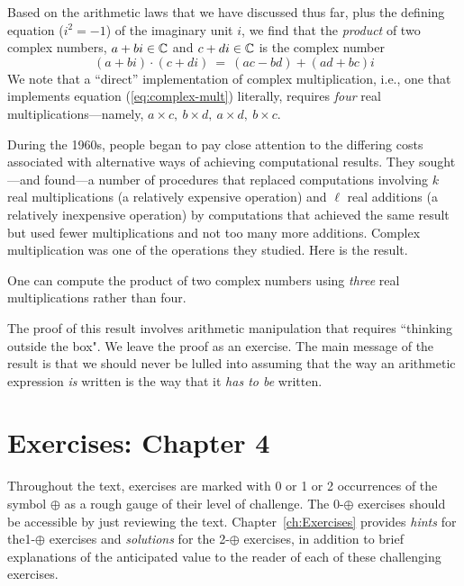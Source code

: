 \medskip

Based on the arithmetic laws that we have discussed thus far, plus the defining equation ($i^2 = -1$) of the imaginary unit $i$, we find that the {\em product} of two complex numbers, $a+bi \in \mathbb{C}$ and $c+di \in \mathbb{C}$ is the complex number
\begin{equation}
\label{eq:complex-mult}
(a+bi) \cdot (c+di) \ = \ (ac - bd) + (ad + bc)i
\end{equation}
We note that a ``direct'' implementation of complex multiplication, i.e., one that implements equation (\ref{eq:complex-mult}) literally, requires {\em four} real multiplications---namely, $a \times c, \ b \times d, \ a \times d, \ b \times c$.

During the 1960s, people began to pay close attention to the differing costs associated with alternative ways of achieving computational results.  They sought---and found---a number of procedures that replaced computations involving $k$ real multiplications (a relatively expensive operation) and $\ell$ real additions (a relatively inexpensive operation) by computations that achieved the same result but used fewer multiplications and not too many more additions. Complex multiplication was one of the operations they studied.  Here is the result.

\begin{prop}
\label{thm:complex-mult-3real}
One can compute the product of two complex numbers using {\em three} real multiplications rather than four.
\end{prop}

The proof of this result involves arithmetic manipulation that requires ``thinking outside the box".  
We leave the proof as an exercise.  The main message of the result is that we should never be lulled into assuming that the way an arithmetic expression {\em is} written is the way that it {\em has to be} written.



\section{Exercises: Chapter 4}

Throughout the text, exercises are marked with 0 or 1 or 2 occurrences of the symbol $\oplus$ as a rough gauge of their level of challenge.  The 0-$\oplus$ exercises should be accessible by just reviewing the text.  Chapter~\ref{ch:Exercises} provides {\em hints} for the1-$\oplus$ exercises and {\em solutions} for the 2-$\oplus$ exercises, in addition to brief explanations of the anticipated value to the reader of each of these challenging exercises. 

